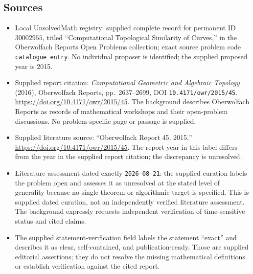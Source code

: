\documentclass[11pt]{article}
\begin{document}
\subsection{Sources}
\begin{itemize}
\item Local UnsolvedMath registry: supplied complete record for permanent ID \(30002955\), titled ``Computational Topological Similarity of Curves,'' in the Oberwolfach Reports Open Problems collection; exact source problem code \texttt{catalogue entry}. No individual proposer is identified; the supplied proposed year is 2015.
\item Supplied report citation: \emph{Computational Geometric and Algebraic Topology} (2016), Oberwolfach Reports, pp.\ 2637--2699, DOI \texttt{10.4171/owr/2015/45}. \url{https://doi.org/10.4171/owr/2015/45}. The background describes Oberwolfach Reports as records of mathematical workshops and their open-problem discussions. No problem-specific page or passage is supplied.
\item Supplied literature source: ``Oberwolfach Report 45, 2015,'' \url{https://doi.org/10.4171/owr/2015/45}. The report year in this label differs from the year in the supplied report citation; the discrepancy is unresolved.
\item Literature assessment dated exactly \texttt{2026-08-21}: the supplied curation labels the problem open and assesses it as unresolved at the stated level of generality because no single theorem or algorithmic target is specified. This is supplied dated curation, not an independently verified literature assessment. The background expressly requests independent verification of time-sensitive status and cited claims.
\item The supplied statement-verification field labels the statement ``exact'' and describes it as clear, self-contained, and publication-ready. Those are supplied editorial assertions; they do not resolve the missing mathematical definitions or establish verification against the cited report.
\end{itemize}
\end{document}
